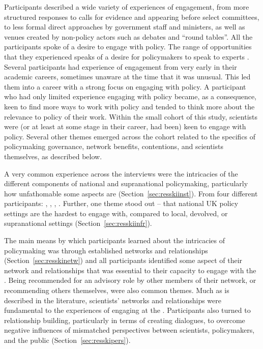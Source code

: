 Participants described a wide variety of experiences of engagement, from more structured responses to calls for evidence and appearing before select committees, to less formal direct approaches by government staff and ministers, as well as venues created by non-policy actors such as debates and ``round tables''. All the participants spoke of a desire to engage with policy. 
The range of opportunities that they experienced speaks of a desire for policymakers to speak to experts%
. Several participants had experience of \SPI{} engagement from very early in their academic careers, sometimes unaware at the time that it was unusual. This led them into a career with a strong focus on engaging with policy. A participant who had only limited experience engaging with policy became, as a consequence, keen to find more ways to work with policy and tended to think more about the relevance to policy of their work. Within the small cohort of this study, scientists were (or at least at some stage in their career, had been) keen to engage with policy. Several other themes emerged across the cohort related to the specifics of policymaking governance, network benefits, \CAN{} contentions, and scientists themselves, as described below. 

A very common experience across the interviews were the intricacies of the different components of national and supranational policymaking, particularly how unfathomable some aspects are (Section~\ref{sec:resskiinst}). From four different participants: , , , . Further, one theme stood out -- that national UK policy settings are the hardest to engage with, compared to local, devolved, or supranational settings (Section~\ref{sec:resskiinfr}).

The main means by which participants learned about the intricacies of policymaking was through established networks and relationships (Section~\ref{sec:resskinetw}) and all participants identified some aspect of their network and relationships that was essential to their capacity to engage with the \SPI. Being recommended for an advisory role by other members of their network, or recommending others themselves, were also common themes. Much as is described in the literature, scientists' networks and relationships were fundamental to the experiences of engaging at the \SPI. Participants also turned to relationship building, particularly in terms of creating dialogues, to overcome negative influences of mismatched perspectives between scientists, policymakers, and the public  (Section~\ref{sec:resskipers}).

